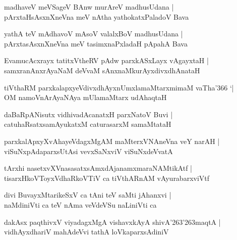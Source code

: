 \documentclass[twoside,12pt,openright]{book}
\def\S{\char'263}
\newcounter{shloka}[chapter]
\begin{document}
\begin{shloka}%
madhaveV meVSageV BAnw murAreV madhusUdana |\\
pArxtaHsAsxnXneVna meV nAtha yathokatxPaladoV Bava
\end{shloka}

\begin{shloka}%
yathA teV mAdhavoV mAsoV valalxBoV madhusUdana |\\
pArxtasAsxnXneVna meV tasimxnaPxladaH pApahA Bava 
\end{shloka}

\begin{shloka}%
EvamucAcxrayx tatitxVtheRV pAdw parxkASxLayx vAgayxtaH |\\
samxranAnxrAyaNaM deVvaM sAnxnaMkurAyxdivxdhAnataH 
\end{shloka}

\begin{shloka}%
tiVthaRM parxkalapxyeVdivxdhAyxnUmxlamaMtarxmimaM vaTha\char'366 `|\\
OM namoVnArAyaNAya mUlamaMtarx udAhaqtaH 
\end{shloka}

\begin{shloka}%
daBaRpANisutx vidhivadAcanatxH parxNatoV Buvi |\\
catuhaRsatxsamAyukatxM caturasarxM samaMtataH 
\end{shloka}

\begin{shloka}%
parxkalApxyXvAhayeVdagxMgAM maMterxVNAneVna veY narAH |\\
viSuNxpAdaparxsUtAsi vevxSaNxviV viSuNxdeVvatA 
\end{shloka}

\begin{shloka}%
tArxhi nasetxvXVnasasatxsAmxdAjanamxmaraNAMtikAtf |\\
tisarxHkoVToyxVdhaRkoVTiV ca tiVthARnAM vAyurabarxviVtf 
\end{shloka}

\begin{shloka}%
divi BuvayxMtarikeSxV ca tAni teV saMti jAhanxvi |\\
naMdiniVti ca teV nAma veVdeVSu naLiniVti ca 
\end{shloka}

\begin{shloka}%
dakAsx paqthivxV viyadagxMgA vishavxkAyA shivA\S\S maqtA |\\
vidhAyxdhariV mahAdeVvi tathA loVkaparxsAdiniV 
\end{shloka}
\end{document}
